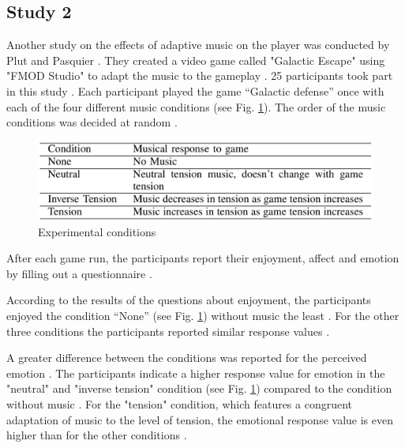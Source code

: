 \subsection{Study 2}
Another study on the effects of adaptive music on the player was conducted by Plut and Pasquier \cite{plut2019music}. They created a video game called "Galactic Escape" using "FMOD Studio" \cite{fmod} to adapt the music to the gameplay \cite{plut2019music}. 25 participants took part in this study \cite{plut2019music}. Each participant played the game “Galactic defense” once with each of the four different music conditions (see Fig. \ref{fig:music_matters_table3}). The order of the music conditions was decided at random \cite{plut2019music}.
\begin{figure}
    \centering
    \includegraphics[width=1\linewidth]{images/music_matters_table3.png}
    \caption{Experimental conditions \cite{plut2019music}}
    \label{fig:music_matters_table3}
\end{figure}
After each game run, the participants report their enjoyment, affect and emotion by filling out a questionnaire \cite{plut2019music}. 

According to the results of the questions about enjoyment, the participants enjoyed the condition “None” (see Fig. \ref{fig:music_matters_table3}) without music the least \cite{plut2019music}. For the other three conditions the participants reported similar response values \cite{plut2019music}.

A greater difference between the conditions was reported for the perceived emotion \cite{plut2019music}. The participants indicate a higher response value for emotion in the "neutral" and "inverse tension" condition (see Fig. \ref{fig:music_matters_table3}) compared to the condition without music \cite{plut2019music}. For the "tension" condition, which features a congruent adaptation of music to the level of tension, the emotional response value is even higher than for the other conditions \cite{plut2019music}.

